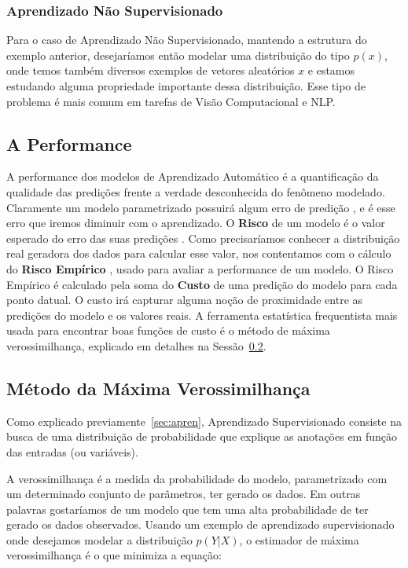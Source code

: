 \subsubsection{Aprendizado Não Supervisionado}

Para o caso de Aprendizado Não Supervisionado, mantendo a estrutura do exemplo
anterior, desejaríamos então modelar uma distribuição do tipo $p(x)$, onde temos
também diversos exemplos de vetores aleatórios $x$ e estamos estudando alguma
propriedade importante dessa distribuição.
Esse tipo de problema é mais comum em tarefas de Visão Computacional e NLP.



\subsection{A Performance}
\label{sec:metricas}

A performance dos modelos de Aprendizado Automático é a quantificação da
qualidade das predições frente a verdade desconhecida do fenômeno modelado.
Claramente um modelo parametrizado possuirá algum erro de predição \citep{dlbook}, e é esse
erro que iremos diminuir com o aprendizado. O \textbf{Risco} de um modelo é o valor
esperado do erro das suas predições \citep{mlprob}.
Como precisaríamos conhecer a distribuição real geradora dos dados para calcular
esse valor, nos contentamos com o cálculo do \textbf{Risco Empírico} \citep{mlprob}, usado para avaliar
a performance de um modelo.
O Risco Empírico é calculado pela soma do \textbf{Custo} de uma predição do modelo para cada ponto datual.
O custo irá capturar alguma noção de proximidade entre as predições do modelo e os valores reais.
A ferramenta estatística frequentista mais usada para encontrar boas funções de custo é o método de máxima verossimilhança, explicado em detalhes na Sessão~\ref{sec:est}. 


\subsection{Método da Máxima Verossimilhança}
\label{sec:est}


Como explicado previamente~\ref{sec:apren}, Aprendizado Supervisionado consiste
na busca de uma distribuição de probabilidade que explique as anotações em
função das entradas (ou variáveis). 

A verossimilhança é a medida da probabilidade do modelo, parametrizado
com um determinado conjunto de parâmetros, ter gerado os dados. Em outras
palavras gostaríamos de um modelo que tem uma alta probabilidade de ter gerado
os dados observados.
Usando um exemplo de aprendizado supervisionado onde
desejamos modelar a distribuição $p(Y|X)$, o estimador de máxima verossimilhança
é o que minimiza a equação:

